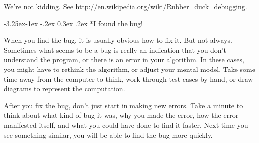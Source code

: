 \documentclass[12pt]{book}
\makeatletter
\theoremstyle{exercise}
\renewcommand\subsection{\@startsection{subsection}{2}{\z@}%
    {-3.25ex\@plus -1ex \@minus -.2ex}%
    {0.3ex \@plus .2ex}%
    {\normalfont\large\bfseries}}
\makeatother
\begin{document}
We're not kidding.
See \url{http://en.wikipedia.org/wiki/Rubber_duck_debugging}.


\subsection*{I found the bug!}

When you find the bug, it is usually obvious how to fix it.
But not always.
Sometimes what seems to be a bug is really an indication that you don't understand the program, or there is an error in your algorithm.
In these cases, you might have to rethink the algorithm, or adjust your mental model.
Take some time away from the computer to think, work through test cases by hand, or draw diagrams to represent the computation.

After you fix the bug, don't just start in making new errors.
Take a minute to think about what kind of bug it was, why you made the error, how the error manifested itself, and what you could have done to find it faster.
Next time you see something similar, you will be able to find the bug more quickly.




%
%
%
%

\printindex
\cleardoublepage
\end{document}
